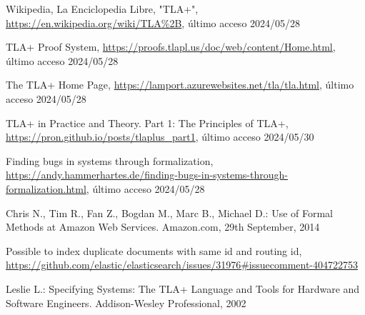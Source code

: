 \documentclass[runningheads]{llncs}
\begin{document}
\begin{thebibliography}{8}
Wikipedia, La Enciclopedia Libre, "TLA+", \url{https://en.wikipedia.org/wiki/TLA%2B}, último acceso 2024/05/28

TLA+ Proof System, \url{https://proofs.tlapl.us/doc/web/content/Home.html}, último acceso 2024/05/28

The TLA+ Home Page, \url{https://lamport.azurewebsites.net/tla/tla.html}, último acceso 2024/05/28

TLA+ in Practice and Theory. Part 1: The Principles of TLA+, \url{https://pron.github.io/posts/tlaplus_part1}, último acceso 2024/05/30

Finding bugs in systems through formalization, \url{https://andy.hammerhartes.de/finding-bugs-in-systems-through-formalization.html}, último acceso 2024/05/28

Chris N., Tim R., Fan Z., Bogdan M., Marc B., Michael D.: Use of Formal Methods at Amazon Web Services. Amazon.com, 29th September, 2014

Possible to index duplicate documents with same id and routing id, \url{https://github.com/elastic/elasticsearch/issues/31976#issuecomment-404722753}

Leslie L.: Specifying Systems: The TLA+ Language and Tools for Hardware and Software Engineers. Addison-Wesley Professional, 2002

\end{thebibliography}
\end{document}
